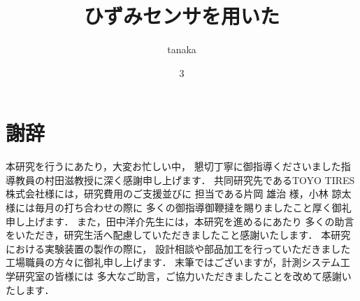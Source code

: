 \documentclass[a4paper,12pt]{jsarticle_measlab_3}
\title{\LARGE ひずみセンサを用いた}
\author{tanaka}
\date{3}
\begin{document}

\newpage

\newpage

\newpage

\newpage


\newpage
\section*{謝辞}
本研究を行うにあたり，大変お忙しい中，
懇切丁寧に御指導くださいました指導教員の村田滋教授に深く感謝申し上げます．
共同研究先であるTOYO TIRES 株式会社様には，研究費用のご支援並びに
担当である片岡 雄治 様，小林 諒太 様には毎月の打ち合わせの際に
多くの御指導御鞭撻を賜りましたこと厚く御礼申し上げます．
また，田中洋介先生には，本研究を進めるにあたり
多くの助言をいただき，研究生活へ配慮していただきましたこと感謝いたします．
本研究における実験装置の製作の際に，
設計相談や部品加工を行っていただきました工場職員の方々に御礼申し上げます．
末筆ではございますが，計測システム工学研究室の皆様には
多大なご助言，ご協力いただきましたことを改めて感謝いたします．

\newpage



\end{document}
